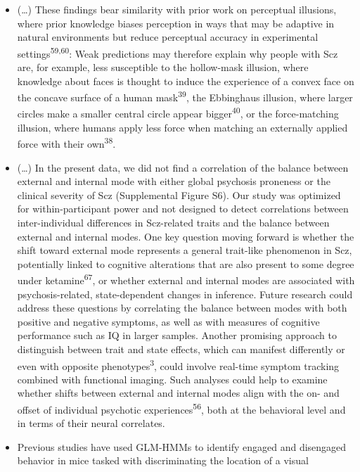 \documentclass[
]{article}
\begin{document}
\begin{itemize}
\item
  (\ldots) These findings bear similarity with prior work on perceptual
  illusions, where prior knowledge biases perception in ways that may be
  adaptive in natural environments but reduce perceptual accuracy in
  experimental settings\textsuperscript{59,60}: Weak predictions may
  therefore explain why people with Scz are, for example, less
  susceptible to the hollow-mask illusion, where knowledge about faces
  is thought to induce the experience of a convex face on the concave
  surface of a human mask\textsuperscript{39}, the Ebbinghaus illusion,
  where larger circles make a smaller central circle appear
  bigger\textsuperscript{40}, or the force-matching illusion, where
  humans apply less force when matching an externally applied force with
  their own\textsuperscript{38}.
\item
  (\ldots) In the present data, we did not find a correlation of the
  balance between external and internal mode with either global
  psychosis proneness or the clinical severity of Scz (Supplemental
  Figure S6). Our study was optimized for within-participant power and
  not designed to detect correlations between inter-individual
  differences in Scz-related traits and the balance between external and
  internal modes. One key question moving forward is whether the shift
  toward external mode represents a general trait-like phenomenon in
  Scz, potentially linked to cognitive alterations that are also present
  to some degree under ketamine\textsuperscript{67}, or whether external
  and internal modes are associated with psychosis-related,
  state-dependent changes in inference. Future research could address
  these questions by correlating the balance between modes with both
  positive and negative symptoms, as well as with measures of cognitive
  performance such as IQ in larger samples. Another promising approach
  to distinguish between trait and state effects, which can manifest
  differently or even with opposite phenotypes\textsuperscript{3}, could
  involve real-time symptom tracking combined with functional imaging.
  Such analyses could help to examine whether shifts between external
  and internal modes align with the on- and offset of individual
  psychotic experiences\textsuperscript{56}, both at the behavioral
  level and in terms of their neural correlates.
\item
  Previous studies have used GLM-HMMs to identify engaged and disengaged
  behavior in mice tasked with discriminating the location of a visual

\end{itemize}
\end{document}
